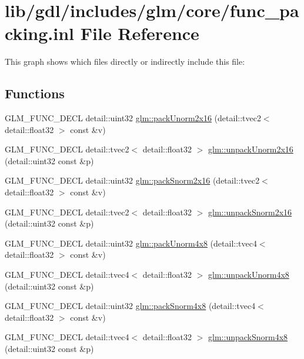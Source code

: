 \hypertarget{func__packing_8inl}{}\section{lib/gdl/includes/glm/core/func\+\_\+packing.inl File Reference}
\label{func__packing_8inl}
This graph shows which files directly or indirectly include this file\+:
\subsection*{Functions}
\begin{DoxyCompactItemize}
\item 
G\+L\+M\+\_\+\+F\+U\+N\+C\+\_\+\+D\+E\+C\+L detail\+::uint32 \hyperlink{group__core__func__packing_ga38cc970d20075fda38a1725f668ec1e3}{glm\+::pack\+Unorm2x16} (detail\+::tvec2$<$ detail\+::float32 $>$ const \&v)
\item 
G\+L\+M\+\_\+\+F\+U\+N\+C\+\_\+\+D\+E\+C\+L detail\+::tvec2$<$ detail\+::float32 $>$ \hyperlink{group__core__func__packing_gaa0b6b63ebe8cd5899b277bce84237ad1}{glm\+::unpack\+Unorm2x16} (detail\+::uint32 const \&p)
\item 
G\+L\+M\+\_\+\+F\+U\+N\+C\+\_\+\+D\+E\+C\+L detail\+::uint32 \hyperlink{group__core__func__packing_ga25db573698cb49ea4c4ef96bfcebecf3}{glm\+::pack\+Snorm2x16} (detail\+::tvec2$<$ detail\+::float32 $>$ const \&v)
\item 
G\+L\+M\+\_\+\+F\+U\+N\+C\+\_\+\+D\+E\+C\+L detail\+::tvec2$<$ detail\+::float32 $>$ \hyperlink{group__core__func__packing_gafeb2843ce77c028f30ef5acb02e7aa2c}{glm\+::unpack\+Snorm2x16} (detail\+::uint32 const \&p)
\item 
G\+L\+M\+\_\+\+F\+U\+N\+C\+\_\+\+D\+E\+C\+L detail\+::uint32 \hyperlink{group__core__func__packing_ga4b10d27c4f1f5be5936b49ccc0d661ec}{glm\+::pack\+Unorm4x8} (detail\+::tvec4$<$ detail\+::float32 $>$ const \&v)
\item 
G\+L\+M\+\_\+\+F\+U\+N\+C\+\_\+\+D\+E\+C\+L detail\+::tvec4$<$ detail\+::float32 $>$ \hyperlink{group__core__func__packing_ga88febf67bc78f5ad96735b0ca9cbb073}{glm\+::unpack\+Unorm4x8} (detail\+::uint32 const \&p)
\item 
G\+L\+M\+\_\+\+F\+U\+N\+C\+\_\+\+D\+E\+C\+L detail\+::uint32 \hyperlink{group__core__func__packing_ga642b59fa9588eee81bea2f35e1556aae}{glm\+::pack\+Snorm4x8} (detail\+::tvec4$<$ detail\+::float32 $>$ const \&v)
\item 
G\+L\+M\+\_\+\+F\+U\+N\+C\+\_\+\+D\+E\+C\+L detail\+::tvec4$<$ detail\+::float32 $>$ \hyperlink{group__core__func__packing_ga9a43a9dd70403585d73627ddec6a85ff}{glm\+::unpack\+Snorm4x8} (detail\+::uint32 const \&p)

\end{DoxyCompactItemize}
